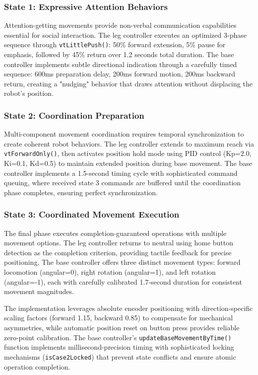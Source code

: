 \subsubsection{State 1: Expressive Attention Behaviors}
Attention-getting movements provide non-verbal communication capabilities essential for social interaction. The leg controller executes an optimized 3-phase sequence through \texttt{vtLittlePush()}: 50\% forward extension, 5\% pause for emphasis, followed by 45\% return over 1.2 seconds total duration. The base controller implements subtle directional indication through a carefully timed sequence: 600ms preparation delay, 200ms forward motion, 200ms backward return, creating a "nudging" behavior that draws attention without displacing the robot's position.

\subsubsection{State 2: Coordination Preparation}
Multi-component movement coordination requires temporal synchronization to create coherent robot behaviors. The leg controller extends to maximum reach via \texttt{vtForwardOnly()}, then activates position hold mode using PID control (Kp=2.0, Ki=0.1, Kd=0.5) to maintain extended position during base movement. The base controller implements a 1.5-second timing cycle with sophisticated command queuing, where received state 3 commands are buffered until the coordination phase completes, ensuring perfect synchronization.

\subsubsection{State 3: Coordinated Movement Execution}
The final phase executes completion-guaranteed operations with multiple movement options. The leg controller returns to neutral using home button detection as the completion criterion, providing tactile feedback for precise positioning. The base controller offers three distinct movement types: forward locomotion (angular=0), right rotation (angular=1), and left rotation (angular=-1), each with carefully calibrated 1.7-second duration for consistent movement magnitudes.

The implementation leverages absolute encoder positioning with direction-specific scaling factors (forward 1.15, backward 0.85) to compensate for mechanical asymmetries, while automatic position reset on button press provides reliable zero-point calibration. The base controller's \texttt{updateBaseMovementByTime()} function implements millisecond-precision timing with sophisticated locking mechanisms (\texttt{isCase2Locked}) that prevent state conflicts and ensure atomic operation completion.

